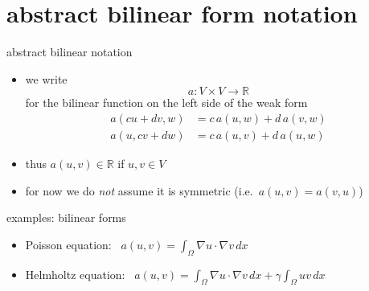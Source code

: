 \documentclass[10pt,
               svgnames,
               hyperref={colorlinks,
                         citecolor=DeepPink4,
                         linkcolor=FireBrick,
                         urlcolor=blue},
               usepdftitle=false]{beamer}
\newcommand{\RR}{\mathbb{R}}
\newcommand{\grad}{\nabla}
\newcommand{\ds}{\displaystyle}
\begin{document}
\AtBeginSection[] {
    \begin{frame}{Outline}
    \setbeamertemplate{section in toc}[sections numbered]
    \tableofcontents[currentsection]%
    \end{frame}
}

\section{abstract bilinear form notation}

\begin{frame}{abstract bilinear notation}

\begin{itemize}
\item we write
    $$a:V\times V\to \RR$$
for the \alert{bilinear function} on the left side of the weak form
\begin{align*}
a(cu+dv,w) &= c\, a(u,w) + d\, a(v,w) \\
a(u,cv+dw) &= c\, a(u,v) + d\, a(u,w)
\end{align*}
\item thus $a(u,v) \in \RR$ if $u,v\in V$
\item for now we do \emph{not} assume it is symmetric (i.e.~$a(u,v)=a(v,u)$)
\end{itemize}

\begin{block}{examples: bilinear forms}
\begin{itemize}
\item Poisson equation: \, $\ds a(u,v) = \int_\Omega \grad u\cdot \grad v\,dx$
\item Helmholtz equation: \, $\ds a(u,v) = \int_\Omega \grad u\cdot \grad v\,dx + \gamma \int_\Omega u v\,dx$
\end{itemize}
\end{block}
\end{frame}
\end{document}
